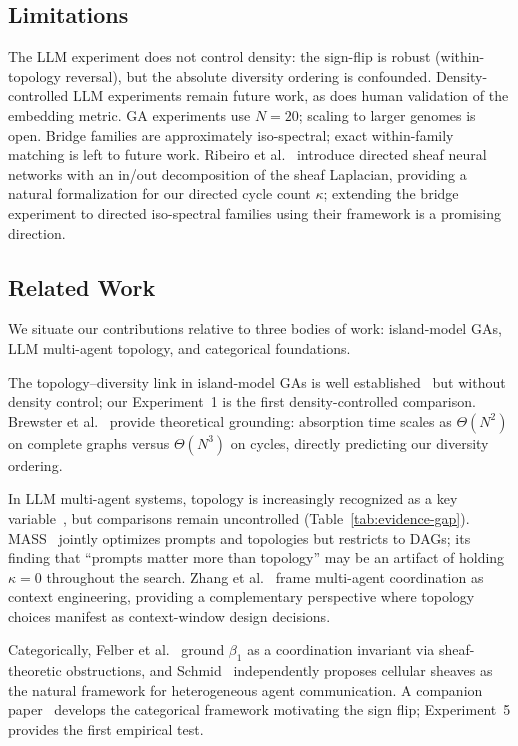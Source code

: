 \documentclass[runningheads]{llncs}
\begin{document}
\subsection{Limitations}

The LLM experiment does not control density: the sign-flip is robust
(within-topology reversal), but the absolute diversity ordering is
confounded. Density-controlled LLM experiments remain future work, as
does human validation of the embedding metric. GA experiments use
$N = 20$; scaling to larger genomes is open. Bridge families are
approximately iso-spectral; exact within-family matching is left to
future work.
Ribeiro et al.~\cite{ribeiro2026directed} introduce directed sheaf
neural networks with an in/out decomposition of the sheaf Laplacian,
providing a natural formalization for our directed cycle count $\kappa$;
extending the bridge experiment to directed iso-spectral families using
their framework is a promising direction.

\subsection{Related Work}
\label{sec:related}

We situate our contributions relative to three bodies of work: island-model GAs, LLM multi-agent topology, and categorical foundations.

The topology--diversity link in island-model GAs is well established~\cite{tomassini2005spatially,skolicki2005influence} but without density control; our Experiment~1 is the first density-controlled comparison. Brewster et al.~\cite{brewster2025diversity} provide theoretical grounding: absorption time scales as $\Theta(N^2)$ on complete graphs versus $\Theta(N^3)$ on cycles, directly predicting our diversity ordering.

In LLM multi-agent systems, topology is increasingly recognized as a key variable~\cite{yang2025topology}, but comparisons remain uncontrolled (Table~\ref{tab:evidence-gap}). MASS~\cite{zhou2025mass} jointly optimizes prompts and topologies but restricts to DAGs; its finding that ``prompts matter more than topology'' may be an artifact of holding $\kappa = 0$ throughout the search. Zhang et al.~\cite{zhang2026ace} frame multi-agent coordination as context engineering, providing a complementary perspective where topology choices manifest as context-window design decisions.

Categorically, Felber et al.~\cite{felber2025task} ground $\beta_1$ as a coordination invariant via sheaf-theoretic obstructions, and Schmid~\cite{schmid2025sheaf} independently proposes cellular sheaves as the natural framework for heterogeneous agent communication. A companion paper~\cite{langer2026games} develops the categorical framework motivating the sign flip; Experiment~5 provides the first empirical test.
\end{document}
